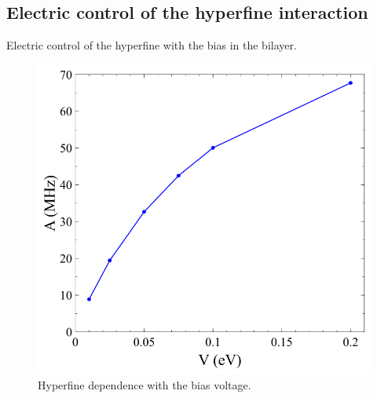 \subsection{Electric control of the hyperfine interaction}
Electric control of the hyperfine with the bias in the bilayer.
\begin{figure}[h!]
\centering
\includegraphics{chapter06/figures/hyperfine.png}
\vspace{-5pt}
\caption{Hyperfine dependence with the bias voltage.}
\end{figure}
\FloatBarrier

